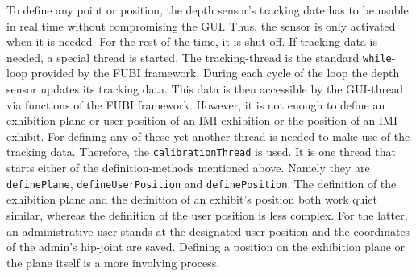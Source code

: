 To define any point or position, the depth sensor's tracking date has to be usable in real time without compromising the \ac{GUI}. Thus, the sensor is only activated when it is needed. For the rest of the time, it is shut off. If tracking data is needed, a special thread is started. The tracking-thread is the standard \texttt{while}-loop provided by the \ac{FUBI} framework. During each cycle of the loop the depth sensor updates its tracking data. This data is then accessible by the \ac{GUI}-thread via functions of the \ac{FUBI} framework. However, it is not enough to define an exhibition plane or user position of an \ac{IMI}-exhibition or the position of an \ac{IMI}-exhibit. For defining any of these yet another thread is needed to make use of the tracking data. Therefore, the \texttt{calibrationThread} is used. It is one thread that starts either of the definition-methods mentioned above. Namely they are \texttt{definePlane}, \texttt{defineUserPosition} and \texttt{definePosition}. The definition of the exhibition plane and the definition of an exhibit's position both work quiet similar, whereas the definition of the user position is less complex. For the latter, an administrative user stands at the designated user position and the coordinates of the admin's hip-joint are saved. Defining a position on the exhibition plane or the plane itself is a more involving process.
\\
